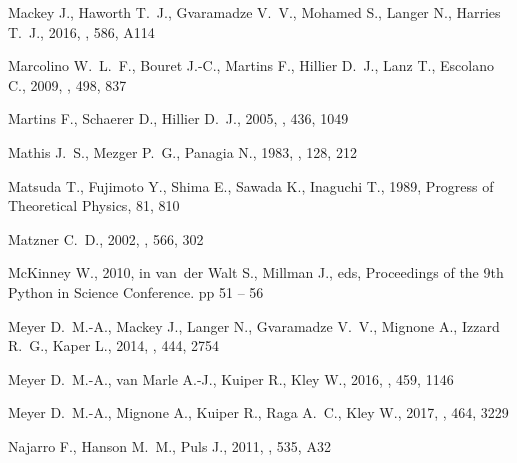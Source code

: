\documentclass[useAMS, usenatbib, a4paper]{mnras}
\begin{document}
\begin{thebibliography}{}
{Mackey} J.,  {Haworth} T.~J.,  {Gvaramadze} V.~V.,  {Mohamed} S.,  {Langer}
  N.,   {Harries} T.~J.,  2016, \aap, 586, A114

{Marcolino} W.~L.~F.,  {Bouret} J.-C.,  {Martins} F.,  {Hillier} D.~J.,  {Lanz}
  T.,   {Escolano} C.,  2009, \aap, 498, 837

{Martins} F.,  {Schaerer} D.,   {Hillier} D.~J.,  2005, \aap, 436, 1049

{Mathis} J.~S.,  {Mezger} P.~G.,   {Panagia} N.,  1983, \aap, 128, 212

{Matsuda} T.,  {Fujimoto} Y.,  {Shima} E.,  {Sawada} K.,   {Inaguchi} T.,
  1989, Progress of Theoretical Physics, 81, 810

{Matzner} C.~D.,  2002, \apj, 566, 302

McKinney W.,  2010, in van~der Walt S.,  Millman J.,  eds, Proceedings of the
  9th Python in Science Conference. pp 51 -- 56

{Meyer} D.~M.-A.,  {Mackey} J.,  {Langer} N.,  {Gvaramadze} V.~V.,  {Mignone}
  A.,  {Izzard} R.~G.,   {Kaper} L.,  2014, \mnras, 444, 2754

{Meyer} D.~M.-A.,  {van Marle} A.-J.,  {Kuiper} R.,   {Kley} W.,  2016, \mnras,
  459, 1146

{Meyer} D.~M.-A.,  {Mignone} A.,  {Kuiper} R.,  {Raga} A.~C.,   {Kley} W.,
  2017, \mnras, 464, 3229

{Najarro} F.,  {Hanson} M.~M.,   {Puls} J.,  2011, \aap, 535, A32


\end{thebibliography}
\end{document}
